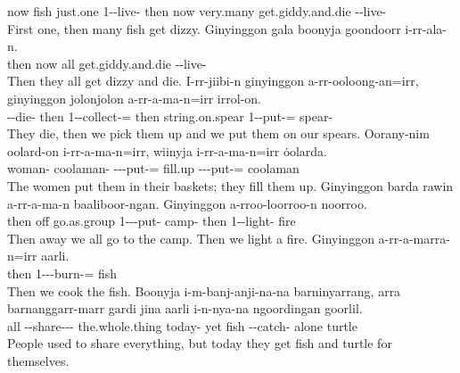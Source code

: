 \begin{exye}
now fish just.one 1--live- then now very.many get.giddy.and.die --live-\\
\ft First one, then many fish get dizzy.
\exy {}
\gll Ginyinggon gala boonyja goondoorr i-rr-ala-n.\\
then now all get.giddy.and.die --live-\\
\ft Then they all get dizzy and die.
\exy {}
\gll I-rr-jiibi-n ginyinggon a-rr-ooloong-an=irr, ginyinggon jolonjolon a-rr-a-ma-n=irr irrol-on.\\
--die- then 1--collect-= then string.on.spear 1--put-= spear-\\
\ft They die, then we pick them up and we put them on our spears.
\newpage\exy {}
\gll Oorany-nim oolard-on i-rr-a-ma-n=irr, wiinyja i-rr-a-ma-n=irr \.{oo}larda.\\
woman- coolaman- ---put-= fill.up ---put-= coolaman\\
\ft The women put them in their baskets; they fill them up.
\exy {}
\gll Ginyinggon barda rawin a-rr-a-ma-n baaliboor-ngan. Ginyinggon a-rroo-loorroo-n noorroo.\\
then off go.as.group 1---put- camp- then 1--light- fire\\
\ft Then away we all go to the camp. Then we light a fire.
\exy {}
\gll Ginyinggon a-rr-a-marra-n=irr aarli.\\
then 1---burn-= fish\\
\ft Then we cook the fish.
\exy {}
\gll Boonyja i-m-banj-anji-na-na barninyarrang, arra barnanggarr-marr gardi jina aarli i-n-nya-na ngoordingan goorlil.\\
all --share--- the.whole.thing  today- yet  fish --catch- alone turtle\\
\ft People used to share everything, but today they get fish and turtle for themselves.
\end{exye}

